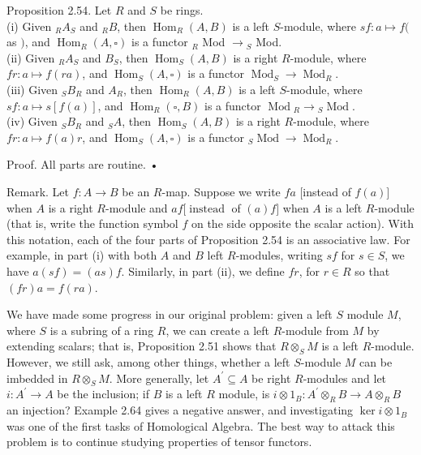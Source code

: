 \documentclass[10pt, letterpaper]{article}
\begin{document}
Proposition 2.54. Let $R$ and $S$ be rings.\\
(i) Given ${ }_{R} A_{S}$ and ${ }_{R} B$, then $\operatorname{Hom}_{R}(A, B)$ is a left $S$-module, where $s f: a \mapsto f($ as $)$, and $\operatorname{Hom}_{R}(A, \square)$ is a functor ${ }_{R}$ Mod $\rightarrow{ }_{S}$ Mod.\\
(ii) Given ${ }_{R} A_{S}$ and $B_{S}$, then $\operatorname{Hom}_{S}(A, B)$ is a right $R$-module, where $f r: a \mapsto f(r a)$, and $\operatorname{Hom}_{S}(A, \square)$ is a functor $\operatorname{Mod}_{S} \rightarrow \operatorname{Mod}_{R}$.\\
(iii) Given ${ }_{S} B_{R}$ and $A_{R}$, then $\operatorname{Hom}_{R}(A, B)$ is a left $S$-module, where $s f: a \mapsto s[f(a)]$, and $\operatorname{Hom}_{R}(\square, B)$ is a functor $\operatorname{Mod}{ }_{R} \rightarrow{ }_{S} \operatorname{Mod}$.\\
(iv) Given ${ }_{S} B_{R}$ and ${ }_{S} A$, then $\operatorname{Hom}_{S}(A, B)$ is a right $R$-module, where $f r: a \mapsto f(a) r$, and $\operatorname{Hom}_{S}(A, \square)$ is a functor ${ }_{S} \operatorname{Mod} \rightarrow \operatorname{Mod}_{R}$.

Proof. All parts are routine. •

Remark. Let $f: A \rightarrow B$ be an $R$-map. Suppose we write $f a$ [instead of $f(a)]$ when $A$ is a right $R$-module and $a f[\operatorname{instead}$ of $(a) f]$ when $A$ is a left $R$-module (that is, write the function symbol $f$ on the side opposite the scalar action). With this notation, each of the four parts of Proposition 2.54 is an associative law. For example, in part (i) with both $A$ and $B$ left $R$-modules, writing $s f$ for $s \in S$, we have $a(s f)=(a s) f$. Similarly, in part (ii), we define $f r$, for $r \in R$ so that $(f r) a=f(r a)$.

We have made some progress in our original problem: given a left $S$ module $M$, where $S$ is a subring of a ring $R$, we can create a left $R$-module from $M$ by extending scalars; that is, Proposition 2.51 shows that $R \otimes_{S} M$ is a left $R$-module. However, we still ask, among other things, whether a left $S$-module $M$ can be imbedded in $R \otimes_{S} M$. More generally, let $A^{\prime} \subseteq A$ be right $R$-modules and let $i: A^{\prime} \rightarrow A$ be the inclusion; if $B$ is a left $R$ module, is $i \otimes 1_{B}: A^{\prime} \otimes_{R} B \rightarrow A \otimes_{R} B$ an injection? Example 2.64 gives a negative answer, and investigating $\operatorname{ker} i \otimes 1_{B}$ was one of the first tasks of Homological Algebra. The best way to attack this problem is to continue studying properties of tensor functors.
\end{document}
